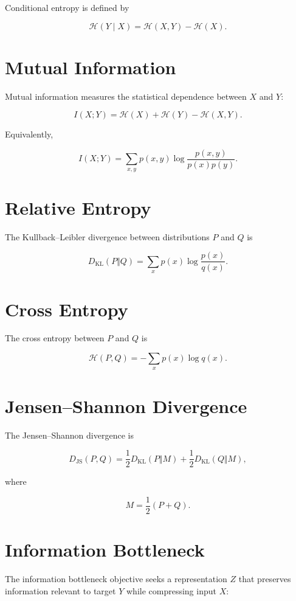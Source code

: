 \documentclass[11pt,oneside]{book}
\theoremstyle{remark}
\newcommand{\Entropy}{\mathcal{H}}
\newcommand{\KL}{D_{\mathrm{KL}}}
\newcommand{\JS}{D_{\mathrm{JS}}}
\begin{document}
	Conditional entropy is defined by
	
	\[
	\Entropy(Y\mid X)
	=
	\Entropy(X,Y)-\Entropy(X).
	\]
	
	\section{Mutual Information}
	
	Mutual information measures the statistical dependence between \(X\) and \(Y\):
	
	\[
	I(X;Y)
	=
	\Entropy(X)+\Entropy(Y)-\Entropy(X,Y).
	\]
	
	Equivalently,
	
	\[
	I(X;Y)
	=
	\sum_{x,y}
	p(x,y)
	\log
	\frac{p(x,y)}{p(x)p(y)}.
	\]
	
	\section{Relative Entropy}
	
	The Kullback--Leibler divergence between distributions \(P\) and \(Q\) is
	
	\[
	\KL(P\Vert Q)
	=
	\sum_x p(x)
	\log
	\frac{p(x)}{q(x)}.
	\]
	
	\section{Cross Entropy}
	
	The cross entropy between \(P\) and \(Q\) is
	
	\[
	\Entropy(P,Q)
	=
	-\sum_x p(x)\log q(x).
	\]
	
	\section{Jensen--Shannon Divergence}
	
	The Jensen--Shannon divergence is
	
	\[
	\JS(P,Q)
	=
	\frac{1}{2}
	\KL(P\Vert M)
	+
	\frac{1}{2}
	\KL(Q\Vert M),
	\]
	
	where
	
	\[
	M=\frac{1}{2}(P+Q).
	\]
	
	\section{Information Bottleneck}
	
	The information bottleneck objective seeks a representation \(Z\) that
	preserves information relevant to target \(Y\) while compressing input \(X\):
	
\end{document}
